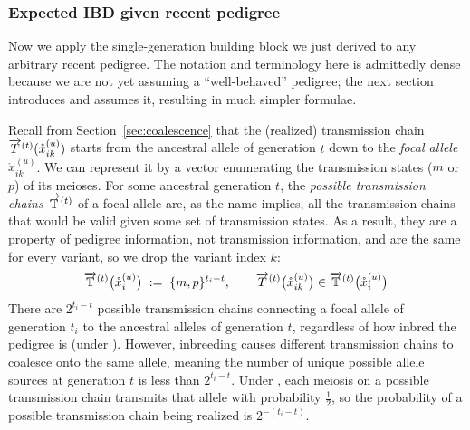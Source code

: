\documentclass[12pt]{article}
\numberwithin{equation}{section}
\begin{document}
\subsubsection{Expected IBD given recent pedigree}\label{sec:ibd-pedigree}

Now we apply the single-generation building block we just derived to any arbitrary recent pedigree.
The notation and terminology here is admittedly dense because we are not yet assuming a ``well-behaved'' pedigree;
the next section introduces and assumes it, resulting in much simpler formulae.


Recall from Section~\ref{sec:coalescence} that the (realized) transmission chain $\overrightarrow{T}^{(t)}(\mathring{x}_{ik}^{(u)})$ starts from the ancestral allele of generation $t$ down to the \emph{focal allele} $\mathring{x}_{ik}^{(u)}$.
We can represent it by a vector enumerating the transmission states ($m$ or $p$) of its meioses.
For some ancestral generation $t$, the \emph{possible transmission chains} $\overrightarrow{\mathbb{T}}^{(t)}$ of a focal allele are, as the name implies, all the transmission chains that would be valid given some set of transmission states.
As a result, they are a property of pedigree information, not transmission information, and are the same for every variant, so we drop the variant index $k$:
\begin{equation}\label{eq:possible-tchains}
    \overrightarrow{\mathbb{T}}^{(t)}\big(\mathring{x}_i^{(u)}\big) \;:=\; \{m,p\}^{t_i - t} ,
    \qquad
    \overrightarrow{T}^{(t)}\big(\mathring{x}_{ik}^{(u)}\big) \in \overrightarrow{\mathbb{T}}^{(t)}\big(\mathring{x}_i^{(u)}\big)
\end{equation}
There are $2^{t_i - t}$ possible transmission chains connecting a focal allele of generation $t_i$ to the ancestral alleles of generation $t$, regardless of how inbred the pedigree is (under ).
However, inbreeding causes different transmission chains to coalesce onto the same allele, meaning the number of unique possible allele sources at generation $t$ is less than $2^{t_i - t}$.
Under , each meiosis on a possible transmission chain transmits that allele with probability $\tfrac12$, so the probability of a possible transmission chain being realized is $2^{-(t_i - t)}$.
\end{document}
